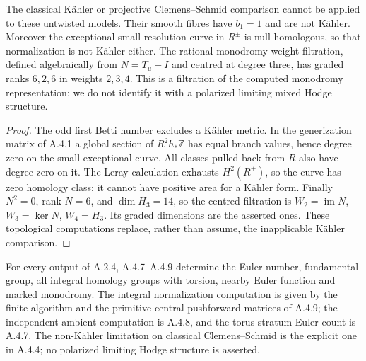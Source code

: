 \begin{proposition}\label{push:A44}
The classical K\"ahler or projective Clemens--Schmid
comparison cannot be applied to these untwisted models.
Their smooth fibres have $b_1=1$ and are not K\"ahler.
Moreover the exceptional small-resolution curve in
$R^\pm$ is null-homologous, so that normalization is
not K\"ahler either. The rational monodromy weight
filtration, defined algebraically from $N=T_u-I$ and
centred at degree three, has graded ranks $6,2,6$ in
weights $2,3,4$. This is a filtration of the computed
monodromy representation; we do not identify it with
a polarized limiting mixed Hodge structure.
\end{proposition}
\begin{proof}
The odd first Betti number excludes a K\"ahler metric.
In the generization matrix of A.4.1 a global section of
$R^2h_*\mathbb Z$ has equal branch values, hence degree
zero on the small exceptional curve. All classes pulled
back from $R$ also have degree zero on it. The Leray
calculation exhausts $H^2(R^\pm)$, so the curve has
zero homology class; it cannot have positive area for
a K\"ahler form. Finally $N^2=0$, rank $N=6$, and
$\dim H_3=14$, so the centred filtration is
$W_2=\operatorname{im}N$, $W_3=\ker N$, $W_4=H_3$.
Its graded dimensions are the asserted ones. These
topological computations replace, rather than assume,
the inapplicable K\"ahler comparison.
\end{proof}

\begin{corollary}\label{push:A45}
For every output of A.2.4, A.4.7--A.4.9 determine the
Euler number, fundamental group, all integral homology
groups with torsion, nearby Euler function and marked
monodromy. The integral normalization computation is
given by the finite algorithm and the primitive
central pushforward matrices of A.4.9; the independent
ambient computation is A.4.8, and the torus-stratum
Euler count is A.4.7. The non-K\"ahler limitation on
classical Clemens--Schmid is the explicit one in
A.4.4; no polarized limiting Hodge structure is
asserted.
\end{corollary}

